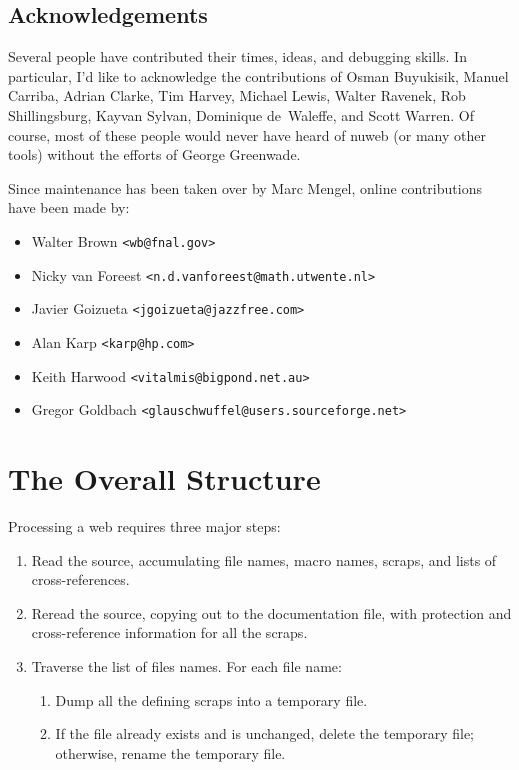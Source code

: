 \documentclass{report}
\newif\ifshowcode
\begin{document}
\section{Acknowledgements}

Several people have contributed their times, ideas, and debugging
skills. In particular, I'd like to acknowledge the contributions of
Osman Buyukisik, Manuel Carriba, Adrian Clarke, Tim Harvey, Michael
Lewis, Walter Ravenek, Rob Shillingsburg, Kayvan Sylvan, Dominique
de~Waleffe, and Scott Warren.  Of course, most of these people would
never have heard of nuweb (or many other tools) without the efforts of
George Greenwade.

Since maintenance has been taken over by Marc Mengel, online contributions
have been made by:
\begin{itemize}
\item Walter Brown \verb|<wb@fnal.gov>|
\item Nicky van Foreest \verb|<n.d.vanforeest@math.utwente.nl>|
\item Javier Goizueta \verb|<jgoizueta@jazzfree.com>|
\item Alan Karp \verb|<karp@hp.com>|
\item Keith Harwood \verb|<vitalmis@bigpond.net.au>|
\item Gregor Goldbach \verb|<glauschwuffel@users.sourceforge.net>|
\end{itemize}

\ifshowcode
\chapter{The Overall Structure}

Processing a web requires three major steps:
\begin{enumerate}
  \item Read the source, accumulating file names, macro names, scraps,
    and lists of cross-references.
  \item Reread the source, copying out to the documentation file, with
    protection and cross-reference information for all the scraps.
  \item Traverse the list of files names. For each file name:
  \begin{enumerate}
    \item Dump all the defining scraps into a temporary file. 
    \item If the file already exists and is unchanged, delete the
      temporary file; otherwise, rename the temporary file.
  \end{enumerate}
\end{enumerate}
\end{document}
